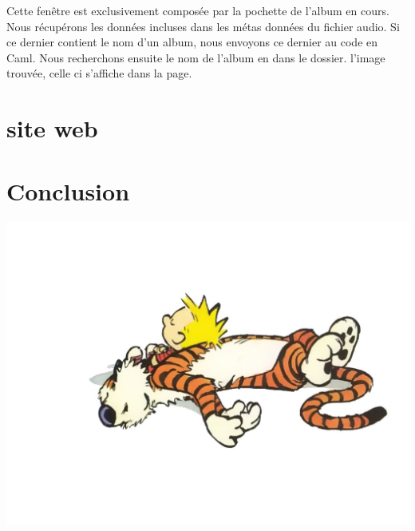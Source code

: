 \documentclass[12pt,a4paper]{report}
\begin{document}
Cette fenêtre est exclusivement composée par la pochette de l'album en cours.
Nous récupérons les données incluses dans les métas données du fichier audio. 
Si ce dernier contient le nom d'un album, nous envoyons ce dernier au code en Caml. 
Nous recherchons ensuite le nom de l'album en dans le dossier. l'image trouvée, celle ci s'affiche dans la page.

\chapter{site web}


\chapter{Conclusion}


\begin{center}
\includegraphics[scale =0.5]{conclu.jpg}
\end{center}
\end{document}
